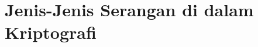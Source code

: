 \documentclass[../main.tex]{subfiles}
\begin{document}
\chapter{Jenis-Jenis Serangan di dalam Kriptografi}
\end{document}
